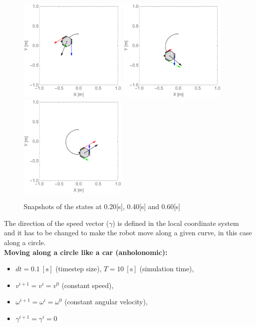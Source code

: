 \documentclass[12pt,english,twoside]{article}
\begin{document}
\begin{figure}[htb!]
	\centering
	\includegraphics[height=5cm]{figures/2d_simulation/animations2/2D_move_along_circle_not_rotating/20}
	\endminipage\hfill
	\centering
	\includegraphics[height=5cm]{figures/2d_simulation/animations2/2D_move_along_circle_not_rotating/40}
	\endminipage\hfill
	\centering
	\includegraphics[height=5cm]{figures/2d_simulation/animations2/2D_move_along_circle_not_rotating/60}
	\endminipage\hfill
	\caption{Snapshots of the states at 0.20[s], 0.40[s] and 0.60[s]}
\end{figure}
The direction of the speed vector ($\gamma$) is defined in the local coordinate system and it has to be changed to make the robot move along a given curve, in this case along a circle.\\[0.3cm]
\noindent \textbf{Moving along a circle like a car (anholonomic):}
\begin{itemize}
	\item $dt=0.1~[\text{s}]$ (timestep size), $T=10~[\text{s}]$ (simulation time),
	\item $v^{i+1} = v^{i} = v^{0}$ (constant speed),
	\item $\omega^{i+1} = \omega^{i} = \omega^{0}$ (constant angular velocity),
	\item $\gamma^{i+1} = \gamma^i = 0$
\end{itemize}
\end{document}
